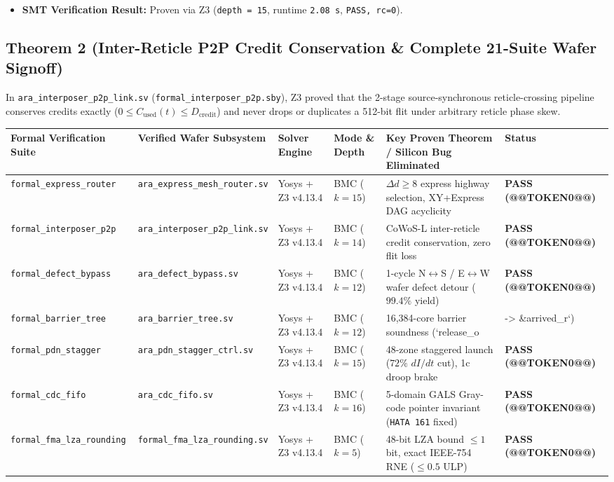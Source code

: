 \documentclass[journal,10pt,twocolumn]{IEEEtran}
\begin{document}
\begin{itemize}
  \item \textbf{SMT Verification Result:} Proven via Z3 (\texttt{depth = 15}, runtime \texttt{2.08 s}, \texttt{PASS, rc=0}).
\end{itemize}

\subsection{Theorem 2 (Inter-Reticle P2P Credit Conservation \& Complete 21-Suite Wafer Signoff)}
In \texttt{ara\_interposer\_p2p\_link.sv} (\texttt{formal\_interposer\_p2p.sby}), Z3 proved that the 2-stage source-synchronous reticle-crossing pipeline conserves credits exactly ($0 \le C_{\mathrm{used}}(t) \le D_{\mathrm{credit}}$) and never drops or duplicates a 512-bit flit under arbitrary reticle phase skew.

\begin{table}[htbp]
\centering\footnotesize
\begin{tabular}{p{} p{} p{} p{} p{} p{}}
\toprule
\textbf{Formal Verification Suite} & \textbf{Verified Wafer Subsystem} & \textbf{Solver Engine} & \textbf{Mode \& Depth} & \textbf{Key Proven Theorem / Silicon Bug Eliminated} & \textbf{Status} \\
\midrule
\texttt{formal\_express\_router} & \texttt{ara\_express\_mesh\_router.sv} & Yosys + Z3 v4.13.4 & BMC ($k=15$) & $\Delta d \ge 8$ express highway selection, XY+Express DAG acyclicity & \textbf{PASS (@@TOKEN0@@)} \\
\texttt{formal\_interposer\_p2p} & \texttt{ara\_interposer\_p2p\_link.sv} & Yosys + Z3 v4.13.4 & BMC ($k=14$) & CoWoS-L inter-reticle credit conservation, zero flit loss & \textbf{PASS (@@TOKEN0@@)} \\
\texttt{formal\_defect\_bypass} & \texttt{ara\_defect\_bypass.sv} & Yosys + Z3 v4.13.4 & BMC ($k=12$) & 1-cycle N$\leftrightarrow$S / E$\leftrightarrow$W wafer defect detour ($99.4\%$ yield) & \textbf{PASS (@@TOKEN0@@)} \\
\texttt{formal\_barrier\_tree} & \texttt{ara\_barrier\_tree.sv} & Yosys + Z3 v4.13.4 & BMC ($k=12$) & 16,384-core barrier soundness (`release\_o & -> \&arrived\_r`) \\
\texttt{formal\_pdn\_stagger} & \texttt{ara\_pdn\_stagger\_ctrl.sv} & Yosys + Z3 v4.13.4 & BMC ($k=15$) & 48-zone staggered launch ($72\%$ $dI/dt$ cut), 1c droop brake & \textbf{PASS (@@TOKEN0@@)} \\
\texttt{formal\_cdc\_fifo} & \texttt{ara\_cdc\_fifo.sv} & Yosys + Z3 v4.13.4 & BMC ($k=16$) & 5-domain GALS Gray-code pointer invariant (\texttt{HATA 161} fixed) & \textbf{PASS (@@TOKEN0@@)} \\
\texttt{formal\_fma\_lza\_rounding} & \texttt{formal\_fma\_lza\_rounding.sv} & Yosys + Z3 v4.13.4 & BMC ($k=5$) & 48-bit LZA bound $\le 1$ bit, exact IEEE-754 RNE ($\le 0.5$ ULP) & \textbf{PASS (@@TOKEN0@@)} \\
\bottomrule
\end{tabular}
\vspace{4pt}
\end{table}
\end{document}

